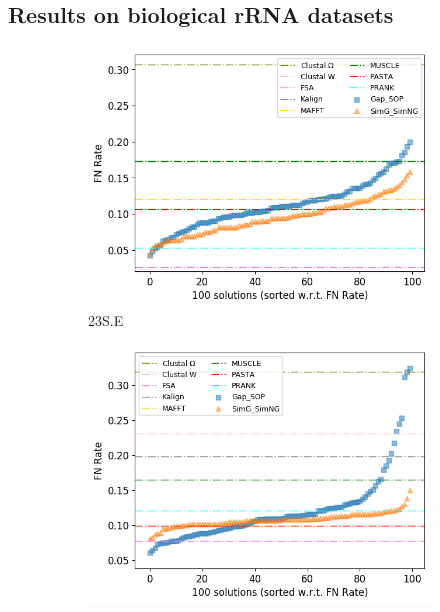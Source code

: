 \subsection{Results on biological rRNA datasets}
\begin{figure}[!htbp]
	\centering
	\begin{adjustwidth}{-0.2cm}{}
		\begin{subfigure}{0.5\columnwidth}
			\includegraphics[width=\columnwidth]{Figure/summary/precomputedInit/23S.E/fnrate_density_single_run}
			\caption{23S.E}
		\end{subfigure}	
		\begin{subfigure}{0.5\columnwidth}
			\includegraphics[width=\columnwidth]{Figure/summary/precomputedInit/23S.E.aa_ag/fnrate_density_single_run}

\end{subfigure}
\end{adjustwidth}
\end{figure}
